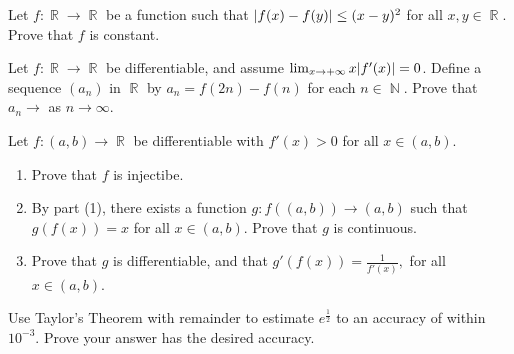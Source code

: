 \documentclass[12pt,letterpaper,boxed]{hmcpset}
\DeclareMathOperator{\N}{\mathbb{N}}
\DeclareMathOperator{\R}{\mathbb{R}}
\DeclarePairedDelimiter\abs{\lvert}{\rvert}%
\begin{document}
\begin{solution}
\end{solution}


\begin{problem}[Exercise 1.5]
Let $f: \R \rightarrow \R$ be a function such that $\abs{f(x) - f(y)} \leq (x - y)^{2}$ for all $x, y \in \R.$ Prove that $f$ is constant.
\end{problem}

\begin{solution}

\end{solution}

\begin{problem}[Exercise 1.11]
Let $f: \R \rightarrow \R$ be differentiable, and assume $\lim_{x \rightarrow +\infty}x\abs{f'(x)}=0$. Define a sequence $(a_n)$ in $\R$ by $a_n = f(2n) -f(n)$ for each $n \in \N$. Prove that $a_n \rightarrow$ as $n\rightarrow\infty$.
\end{problem}

\begin{solution}

\end{solution}

\begin{problem}[Exercise 1.12]
Let $f: (a,b) \rightarrow \R$ be differentiable with $f'(x) > 0$ for all $x\in(a,b)$.
\begin{enumerate}
    \item Prove that $f$ is injectibe.
    \item By part (1), there exists a function $g : f((a,b))\rightarrow (a,b)$ such that $g(f(x))= x$ for all $x\in(a, b).$ Prove that $g$ is continuous.
    \item Prove that $g$ is differentiable, and that $g'(f(x))= \frac{1}{f'(x)},$ for all $x \in (a,b)$.
\end{enumerate}
\end{problem}

\begin{solution}

\end{solution}

\begin{problem}[Exercise 1.17]
Use Taylor's Theorem with remainder to estimate $e^{\frac{1}{2}}$ to an accuracy of within $10^{-3}.$ Prove your answer has the desired accuracy.
\end{problem}

\begin{solution}

\end{solution}
\end{document}
